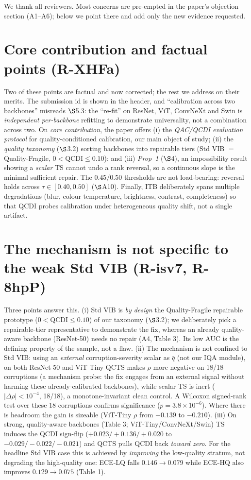 \documentclass[10pt,twocolumn,letterpaper]{article}
\begin{document}
\thispagestyle{empty}
\appendix

We thank all reviewers. Most concerns are pre-empted in the paper's objection section (A1--A6); below we point there and add only the new evidence requested.

\section{Core contribution and factual points (R-XHFa)}
Two of these points are factual and now corrected; the rest we address on their merits. The submission id is shown in the header, and ``calibration across two backbones'' misreads $\S$5.3: the ``re-fit'' on ResNet, ViT, ConvNeXt and Swin is \emph{independent per-backbone} refitting to demonstrate universality, not a combination across two. On \emph{core contribution}, the paper offers (i) the \emph{QAC/QCDI evaluation protocol} for quality-conditioned calibration, our main object of study; (ii) the \emph{quality taxonomy} ($\S$3.2) sorting backbones into repairable tiers (Std VIB $=$ Quality-Fragile, $0<\mathrm{QCDI}\le0.10$); and (iii) \emph{Prop~1} ($\S$4), an impossibility result showing a \emph{scalar} TS cannot undo a rank reversal, so a continuous slope is the minimal sufficient repair. The $0.45/0.50$ thresholds are not load-bearing: reversal holds across $\tau\in[0.40,0.50]$ ($\S$A10). Finally, ITB deliberately spans multiple degradations (blur, colour-temperature, brightness, contrast, completeness) so that QCDI probes calibration under heterogeneous quality shift, not a single artifact.

\section{The mechanism is not specific to the weak Std VIB (R-isv7, R-8hpP)}
Three points answer this. (i) Std VIB is \emph{by design} the Quality-Fragile repairable prototype ($0<\mathrm{QCDI}\le0.10$) of our taxonomy ($\S$3.2); we deliberately pick a repairable-tier representative to demonstrate the fix, whereas an already quality-aware backbone (ResNet-50) needs no repair (A4, Table 3). Its low AUC is the defining property of the sample, not a flaw. (ii) The mechanism is not confined to Std VIB: using an \emph{external} corruption-severity scalar as $\bar q$ (not our IQA module), on both ResNet-50 and ViT-Tiny QCTS makes $\rho$ more negative on 18/18 corruptions (a mechanism probe: the fix engages from an external signal without harming these already-calibrated backbones), while scalar TS is inert ($|\Delta\rho|<10^{-4}$, 18/18), a monotone-invariant clean control. A Wilcoxon signed-rank test over these 18 corruptions confirms significance ($p=3.8\times10^{-6}$). Where there is headroom the gain is sizeable (ViT-Tiny $\rho$ from $-0.139$ to $-0.210$). (iii) On strong, quality-aware backbones (Table 3; ViT-Tiny/ConvNeXt/Swin) TS induces the QCDI sign-flip ($+0.023/+0.136/+0.020$ to $-0.029/-0.022/-0.021$) and QCTS pulls QCDI back \emph{toward zero}. For the headline Std VIB case this is achieved by \emph{improving} the low-quality stratum, not degrading the high-quality one: ECE-LQ falls $0.146\to0.079$ while ECE-HQ also improves $0.129\to0.075$ (Table 1).
\end{document}
